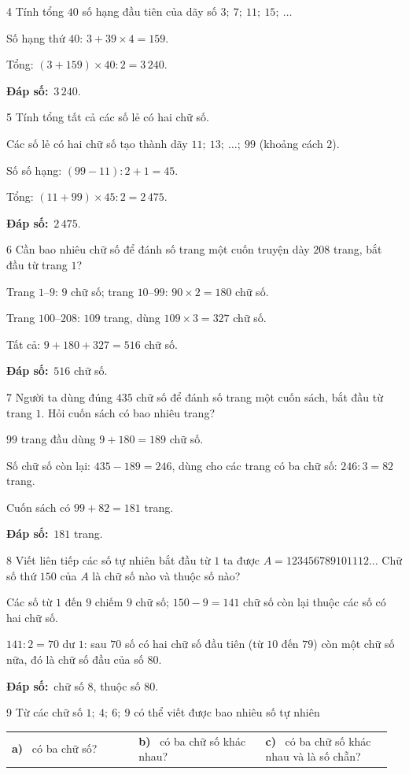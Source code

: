 \documentclass[11pt]{article}
\makeatletter
\newif\ifsol \solfalse
\renewcommand{\arraystretch}{1.35}
\providecommand{\AnsWord}{Đáp số}
\newcommand{\dapso}[1]{\par\textbf{\AnsWord:}\ #1}
\newcommand{\probsol}[1]{%
  \begin{lrbox}{\solmeasure}\begin{minipage}{\dimexpr\linewidth-24pt\relax}#1\end{minipage}\end{lrbox}%
  \ifsol
    \begin{solbox}#1\end{solbox}%
  \else
    \setlength{\solht}{\dimexpr\ht\solmeasure+\dp\solmeasure+0.85cm\relax}%
    \ifdim\solht<1.35cm\setlength{\solht}{1.35cm}\fi
    \begin{tcolorbox}[colback=white,colframe=Line,boxrule=0.8pt,arc=5pt,
      left=8pt,right=8pt,top=4pt,bottom=4pt,height=\solht]{\footnotesize\color{Slate}\itshape\WorkWord}\end{tcolorbox}%
  \fi}
\newcommand{\pa}[1]{\textbf{#1)}\ }
\newenvironment{cols3}{\par\vspace{3pt}\noindent\setlength{\tabcolsep}{0pt}\renewcommand{\arraystretch}{1.3}%
  \begin{tabular}{@{}>{\raggedright\arraybackslash\rule{0pt}{4.4ex}}p{0.32\linewidth}<{\rule[-2.3ex]{0pt}{0pt}}@{\hspace{0.015\linewidth}}>{\raggedright\arraybackslash\rule{0pt}{4.4ex}}p{0.32\linewidth}<{\rule[-2.3ex]{0pt}{0pt}}@{\hspace{0.015\linewidth}}>{\raggedright\arraybackslash\rule{0pt}{4.4ex}}p{0.32\linewidth}<{\rule[-2.3ex]{0pt}{0pt}}@{}}}%
  {\end{tabular}\par}
\newcommand{\gap}{\vspace{0.3cm}}
\def\WorkWord{Bài làm:}
\def\AnsWord{Đáp số}
\makeatother
\begin{document}
\gap
\begin{probbox}{4}{\relax}
Tính tổng $40$ số hạng đầu tiên của dãy số $3;\ 7;\ 11;\ 15;\ \dots$
\end{probbox}
\probsol{
Số hạng thứ $40$: $3+39\times4=159$.\par Tổng: $(3+159)\times40:2=3\,240$.
\dapso{$3\,240$.}}
\gap
\begin{probbox}{5}{\relax}
Tính tổng tất cả các số lẻ có hai chữ số.
\end{probbox}
\probsol{
Các số lẻ có hai chữ số tạo thành dãy $11;\ 13;\ \dots;\ 99$ (khoảng cách $2$).\par
Số số hạng: $(99-11):2+1=45$.\par Tổng: $(11+99)\times45:2=2\,475$.
\dapso{$2\,475$.}}
\gap
\begin{probbox}{6}{\relax}
Cần bao nhiêu chữ số để đánh số trang một cuốn truyện dày $208$ trang, bắt đầu từ trang $1$?
\end{probbox}
\probsol{
Trang $1$--$9$: $9$ chữ số; trang $10$--$99$: $90\times2=180$ chữ số.\par
Trang $100$--$208$: $109$ trang, dùng $109\times3=327$ chữ số.\par
Tất cả: $9+180+327=516$ chữ số.
\dapso{$516$ chữ số.}}
\gap
\begin{probbox}{7}{\relax}
Người ta dùng đúng $435$ chữ số để đánh số trang một cuốn sách, bắt đầu từ trang $1$. Hỏi cuốn sách có bao nhiêu trang?
\end{probbox}
\probsol{
$99$ trang đầu dùng $9+180=189$ chữ số.\par
Số chữ số còn lại: $435-189=246$, dùng cho các trang có ba chữ số: $246:3=82$ trang.\par
Cuốn sách có $99+82=181$ trang.
\dapso{$181$ trang.}}
\gap
\begin{probbox}{8}{\relax}
Viết liên tiếp các số tự nhiên bắt đầu từ $1$ ta được $A=123456789101112\dots$ Chữ số thứ $150$ của $A$ là chữ số nào và thuộc số nào?
\end{probbox}
\probsol{
Các số từ $1$ đến $9$ chiếm $9$ chữ số; $150-9=141$ chữ số còn lại thuộc các số có hai chữ số.\par
$141:2=70$ dư $1$: sau $70$ số có hai chữ số đầu tiên (từ $10$ đến $79$) còn một chữ số nữa, đó là chữ số đầu của số $80$.
\dapso{chữ số $8$, thuộc số $80$.}}
\gap
\begin{probbox}{9}{\relax}
Từ các chữ số $1;\ 4;\ 6;\ 9$ có thể viết được bao nhiêu số tự nhiên
\begin{cols3}
\pa{a} có ba chữ số? & \pa{b} có ba chữ số khác nhau? & \pa{c} có ba chữ số khác nhau và là số chẵn?
\end{cols3}
\end{probbox}
\end{document}
